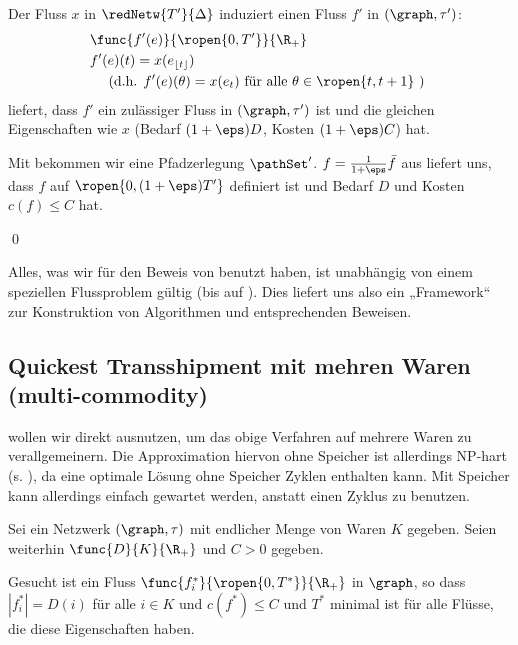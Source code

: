 \begin{standaloneProof}
    Der Fluss $x$ in $\redNetw{T'}{\Delta}$ induziert einen Fluss $f'$ in
    $(\graph, \tau')$:
    \begin{align*}
        & \func{f'(e)}{\ropen{0,T'}}{\R_+} \\
        & f'(e)(t) = x(e_{\lfloor t \rfloor}) \\
        & \quad \text{ (d.h. } f'(e)(\theta) = x(e_t)
            \text{ für alle } \theta \in \ropen{t, t+1} \text{ ) }
    \end{align*}
     liefert, dass $f'$ ein zulässiger Fluss in
    $(\graph, \tau')$ ist und die gleichen Eigenschaften wie $x$
    (Bedarf $(1+\eps)D$, Kosten $(1+\eps)C$) hat.
    
    Mit  bekommen wir eine Pfadzerlegung $\pathSet'$.
    $f = \frac{1}{1+\eps} \bar{f}$ aus  liefert uns, dass
    $f$ auf $\ropen{0, (1 + \eps)T'}$ definiert ist und Bedarf $D$ und Kosten
    $c(f) \leq C$ hat.
    \begin{flushright}\qed \end{flushright}
\end{standaloneProof}

\begin{remark}\label{rem:reuse}
    Alles, was wir für den Beweis von  benutzt haben, ist
    unabhängig von einem speziellen Flussproblem gültig
    (bis auf ). Dies liefert uns also ein „Framework“
    zur Konstruktion von Algorithmen und entsprechenden Beweisen.
\end{remark}

\subsection{Quickest Transshipment mit mehren Waren (multi-commodity)}
 wollen wir direkt ausnutzen, um das obige Verfahren auf mehrere
Waren zu verallgemeinern. Die Approximation hiervon ohne Speicher ist allerdings
NP-hart (s. \cite{fleischerSiam}), da eine optimale Lösung ohne Speicher
Zyklen enthalten kann. Mit Speicher kann allerdings einfach gewartet werden,
anstatt einen Zyklus zu benutzen.

\begin{problem}
\label{prob:qtp_multi}
    Sei ein Netzwerk $(\graph, \tau)$ mit endlicher Menge von Waren $K$ gegeben.
    Seien weiterhin $\func{D}{K}{\R_+}$ und $C > 0$ gegeben.

    Gesucht ist ein Fluss $\func{f_i^*}{\ropen{0,T^*}}{\R_+}$ in $\graph$,
    so dass $|f_i^*| = D(i)$ für alle $i \in K$ und
    $c(f^*) \leq C$ und $T^*$ minimal ist für alle Flüsse,
    die diese Eigenschaften haben.
\end{problem}

